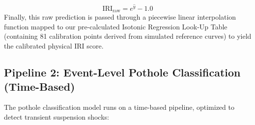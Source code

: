 \documentclass[conference]{IEEEtran}
\begin{document}
\begin{enumerate}
    \begin{equation}
    \text{IRI}_{\text{raw}} = e^{\hat{y}} - 1.0
    \end{equation}
    Finally, this raw prediction is passed through a piecewise linear interpolation function mapped to our pre-calculated Isotonic Regression Look-Up Table (containing 81 calibration points derived from simulated reference curves) to yield the calibrated physical IRI score.
\end{enumerate}

\subsection{Pipeline 2: Event-Level Pothole Classification (Time-Based)}
The pothole classification model runs on a time-based pipeline, optimized to detect transient suspension shocks:
\end{document}
